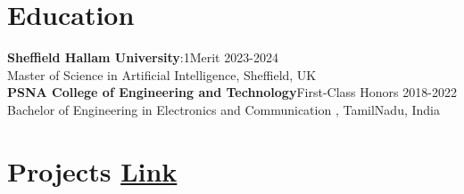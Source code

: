 \documentclass[10 pt, letterpaper]{article}
\begin{document}
\section*{Education}
\textbf{Sheffield Hallam University}:1\textbar Merit \hfill{2023-2024} \\ Master of Science in Artificial Intelligence, Sheffield, UK \\

\textbf{PSNA College of Engineering and Technology}\textbar First-Class Honors \hfill{2018-2022} \\Bachelor of Engineering in Electronics and Communication , TamilNadu, India  \\
\vspace{-0.5cm}

\section*{Projects \textbar \href{https://github.com/Seetharamanrs?tab=repositories} {Link}}
\end{document}
